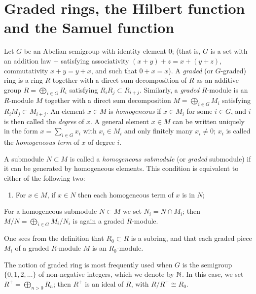 \section{Graded rings, the Hilbert function and the Samuel function}\label{sec:13}

Let $G$ be an Abelian semigroup with identity element $0$; (that is, $G$
is a set with an addition law $+$ satisfying associativity $(x + y) + z = x +
(y + z)$, commutativity $x + y = y + x$, and such that $0 + x = x$). A \emph{graded} (or
$G$-graded) ring is a ring $R$ together with a direct sum decomposition of $R$ as
an additive group $R = \bigoplus_{i \in G} R_i$ satisfying $R_iR_j \subset R_{i+j}$. Similarly, a \emph{graded}
$R$-module is an $R$-module $M$ together with a direct sum decomposition $M =
\bigoplus_{i \in G} M_i$ satisfying $R_iM_j \subset M_{i+j}$. An element $x \in M$ is \emph{homogeneous} if
$x \in M_i$ for some $i \in G$, and $i$ is then called the \emph{degree} of $x$. A general element
$x \in M$ can be written uniquely in the form $x = \sum_{i \in G} x_i$ with $x_i \in M_i$ and only
finitely many $x_i \neq 0$; $x_i$ is called the \emph{homogeneous term} of $x$ of degree $i$.

A submodule $N \subset M$ is called a \emph{homogeneous submodule} (or \emph{graded}
submodule) if it can be generated by homogeneous elements. This
condition is equivalent to either of the following two:
\begin{enumerate}[(1)]
  \item For $x \in M$, if $x \in N$ then each homogeneous term of $x$ is in $N$;
\end{enumerate}
For a homogeneous submodule $N \subset M$ we set $N_i = N \cap M_i$; then
$M/N = \bigoplus_{i \in G} M_i/N_i$ is again a graded $R$-module.

One sees from the definition that $R_0 \subset R$ is a subring, and that each
graded piece $M_i$ of a graded $R$-module $M$ is an $R_0$-module.

The notion of graded ring is most frequently used when $G$ is the
semigroup $\{0, 1, 2, \ldots\}$ of non-negative integers, which we denote by $\mathbb{N}$. In this
case, we set $R^+ = \bigoplus_{n > 0} R_n$; then $R^+$ is an ideal of $R$, with $R/R^+ \cong R_0$.

